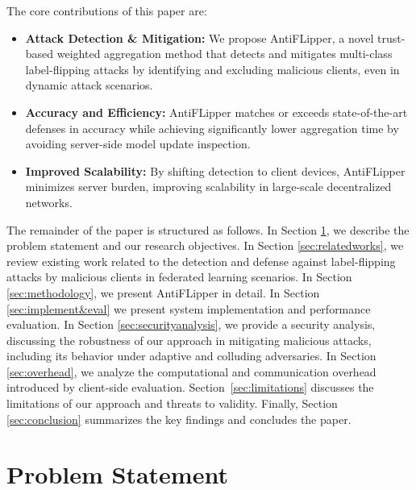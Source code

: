 \documentclass[conference]{IEEEtran}
\begin{document}
The core contributions of this paper are:

\begin{itemize}
   \item \textbf{Attack Detection \& Mitigation:} We propose AntiFLipper, a novel trust-based weighted aggregation method that detects and mitigates multi-class label-flipping attacks by identifying and excluding malicious clients, even in dynamic attack scenarios.

   \item \textbf{Accuracy and Efficiency:} AntiFLipper matches or exceeds state-of-the-art defenses in accuracy while achieving significantly lower aggregation time by avoiding server-side model update inspection.

   \item \textbf{Improved Scalability:} By shifting detection to client devices, AntiFLipper minimizes server burden, improving scalability in large-scale decentralized networks.
    
\end{itemize}


    The remainder of the paper is structured as follows. In Section \ref{sec:problem Statement}, we describe the problem statement and our research objectives. In Section \ref{sec:relatedworks}, we review existing work related to the detection and defense against label-flipping attacks by malicious clients in federated learning scenarios. In Section \ref{sec:methodology}, we present AntiFLipper in detail.  In Section \ref{sec:implement&eval} we present system implementation and performance evaluation. In Section \ref{sec:securityanalysis}, we provide a security analysis, discussing the robustness of our approach in mitigating malicious attacks, including its behavior under adaptive and colluding adversaries. In Section \ref{sec:overhead}, we analyze the computational and communication overhead introduced by client-side evaluation. Section~\ref{sec:limitations} discusses the limitations of our approach and threats to validity. Finally, Section \ref{sec:conclusion} summarizes the key findings and concludes the paper.


\section{Problem Statement}
\label{sec:problem Statement}
\end{document}
